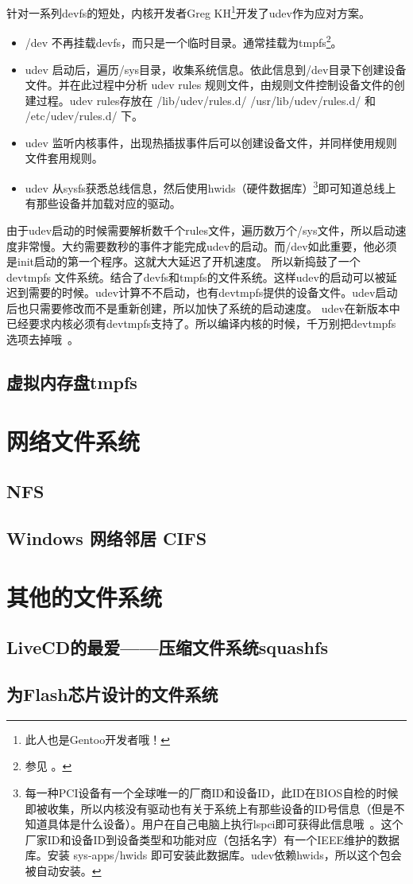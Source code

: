 针对一系列devfs的短处，内核开发者Greg KH\footnote{此人也是Gentoo开发者哦！}开发了udev作为应对方案。

\begin{itemize}
\item /dev 不再挂载devfs，而只是一个临时目录。通常挂载为tmpfs\footnote{参见 。}。
\item udev 启动后，遍历/sys目录，收集系统信息。依此信息到/dev目录下创建设备文件。并在此过程中分析 udev rules 规则文件，由规则文件控制设备文件的创建过程。udev rules存放在 /lib/udev/rules.d/ /usr/lib/udev/rules.d/ 和 /etc/udev/rules.d/ 下。
\item udev 监听内核事件，出现热插拔事件后可以创建设备文件，并同样使用规则文件套用规则。
\item udev 从sysfs获悉总线信息，然后使用hwids（硬件数据库）\footnote{每一种PCI设备有一个全球唯一的厂商ID和设备ID，此ID在BIOS自检的时候即被收集，所以内核没有驱动也有关于系统上有那些设备的ID号信息（但是不知道具体是什么设备）。用户在自己电脑上执行lspci即可获得此信息哦~。这个厂家ID和设备ID到设备类型和功能对应（包括名字）有一个IEEE维护的数据库。安装 sys-apps/hwids 即可安装此数据库。udev依赖hwids，所以这个包会被自动安装。}即可知道总线上有那些设备并加载对应的驱动。
\end{itemize}

由于udev启动的时候需要解析数千个rules文件，遍历数万个/sys文件，所以启动速度非常慢。大约需要数秒的事件才能完成udev的启动。而/dev如此重要，他必须是init启动的第一个程序。这就大大延迟了开机速度。
所以新捣鼓了一个 devtmpfs 文件系统。结合了devfs和tmpfs的文件系统。这样udev的启动可以被延迟到需要的时候。udev计算不不启动，也有devtmpfs提供的设备文件。udev启动后也只需要修改而不是重新创建，所以加快了系统的启动速度。
udev在新版本中已经要求内核必须有devtmpfs支持了。所以编译内核的时候，千万别把devtmpfs选项去掉哦~。

\subsection{虚拟内存盘tmpfs}\label{sec:tmpfs}

\section{网络文件系统}

\subsection{NFS}

\subsection{Windows 网络邻居 CIFS}

\section{其他的文件系统}

\subsection{LiveCD的最爱——压缩文件系统squashfs}

\subsection{为Flash芯片设计的文件系统}
